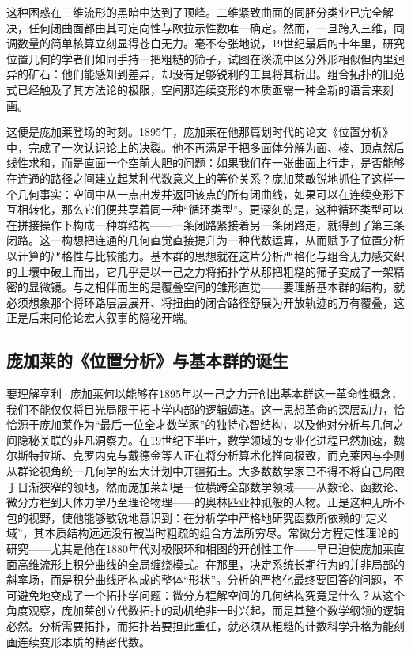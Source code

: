 \documentclass[12pt,a4paper]{article}
\begin{document}
这种困惑在三维流形的黑暗中达到了顶峰。二维紧致曲面的同胚分类业已完全解决，任何闭曲面都由其可定向性与欧拉示性数唯一确定。然而，一旦跨入三维，同调数量的简单核算立刻显得苍白无力。毫不夸张地说，19世纪最后的十年里，研究位置几何的学者们如同手持一把粗糙的筛子，试图在溪流中区分外形相似但内里迥异的矿石：他们能感知到差异，却没有足够锐利的工具将其析出。组合拓扑的旧范式已经触及了其方法论的极限，空间那连续变形的本质亟需一种全新的语言来刻画。

这便是庞加莱登场的时刻。1895年，庞加莱在他那篇划时代的论文《位置分析》中，完成了一次认识论上的决裂。他不再满足于把多面体分解为面、棱、顶点然后线性求和，而是直面一个空前大胆的问题：如果我们在一张曲面上行走，是否能够在连通的路径之间建立起某种代数意义上的等价关系？庞加莱敏锐地抓住了这样一个几何事实：空间中从一点出发并返回该点的所有闭曲线，如果可以在连续变形下互相转化，那么它们便共享着同一种“循环类型”。更深刻的是，这种循环类型可以在拼接操作下构成一种群结构——一条闭路紧接着另一条闭路走，就得到了第三条闭路。这一构想把连通的几何直觉直接提升为一种代数运算，从而赋予了位置分析以计算的严格性与比较能力。基本群的思想就在这片分析严格化与组合无力感交织的土壤中破土而出，它几乎是以一己之力将拓扑学从那把粗糙的筛子变成了一架精密的显微镜。与之相伴而生的是覆叠空间的雏形直觉——要理解基本群的结构，就必须想象那个将环路层层展开、将扭曲的闭合路径舒展为开放轨迹的万有覆叠，这正是后来同伦论宏大叙事的隐秘开端。

\subsection{庞加莱的《位置分析》与基本群的诞生}

要理解亨利·庞加莱何以能够在1895年以一己之力开创出基本群这一革命性概念，我们不能仅仅将目光局限于拓扑学内部的逻辑嬗递。这一思想革命的深层动力，恰恰源于庞加莱作为“最后一位全才数学家”的独特心智结构，以及他对分析与几何之间隐秘关联的非凡洞察力。在19世纪下半叶，数学领域的专业化进程已然加速，魏尔斯特拉斯、克罗内克与戴德金等人正在将分析算术化推向极致，而克莱因与李则从群论视角统一几何学的宏大计划中开疆拓土。大多数数学家已不得不将自己局限于日渐狭窄的领地，然而庞加莱却是一位横跨全部数学领域——从数论、函数论、微分方程到天体力学乃至理论物理——的奥林匹亚神祇般的人物。正是这种无所不包的视野，使他能够敏锐地意识到：在分析学中严格地研究函数所依赖的“定义域”，其本质结构远远没有被当时粗疏的组合方法所穷尽。常微分方程定性理论的研究——尤其是他在1880年代对极限环和相图的开创性工作——早已迫使庞加莱直面高维流形上积分曲线的全局缠绕模式。在那里，决定系统长期行为的并非局部的斜率场，而是积分曲线所构成的整体“形状”。分析的严格化最终要回答的问题，不可避免地变成了一个拓扑学问题：微分方程解空间的几何结构究竟是什么？从这个角度观察，庞加莱创立代数拓扑的动机绝非一时兴起，而是其整个数学纲领的逻辑必然。分析需要拓扑，而拓扑若要担此重任，就必须从粗糙的计数科学升格为能刻画连续变形本质的精密代数。
\end{document}
